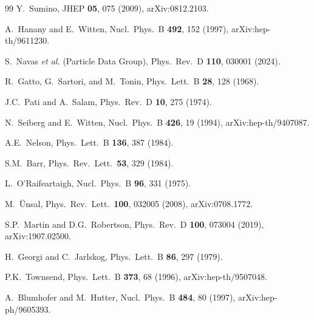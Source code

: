 \documentclass[12pt,a4paper]{article}
\begin{document}
\begin{thebibliography}{99}
  Y.~Sumino,
  JHEP \textbf{05}, 075 (2009),
  arXiv:0812.2103.

  A.~Hanany and E.~Witten,
  Nucl.\ Phys.\ B \textbf{492}, 152 (1997),
  arXiv:hep-th/9611230.

  S.~Navas \textit{et al.} (Particle Data Group),
  Phys.\ Rev.\ D \textbf{110}, 030001 (2024).

  R.~Gatto, G.~Sartori, and M.~Tonin,
  Phys.\ Lett.\ B \textbf{28}, 128 (1968).

  J.C.~Pati and A.~Salam,
  Phys.\ Rev.\ D \textbf{10}, 275 (1974).

  N.~Seiberg and E.~Witten,
  Nucl.\ Phys.\ B \textbf{426}, 19 (1994),
  arXiv:hep-th/9407087.

  A.E.~Nelson,
  Phys.\ Lett.\ B \textbf{136}, 387 (1984).

  S.M.~Barr,
  Phys.\ Rev.\ Lett.\ \textbf{53}, 329 (1984).

  L.~O'Raifeartaigh,
  Nucl.\ Phys.\ B \textbf{96}, 331 (1975).

  M.~\"Unsal,
  Phys.\ Rev.\ Lett.\ \textbf{100}, 032005 (2008),
  arXiv:0708.1772.

  S.P.~Martin and D.G.~Robertson,
  Phys.\ Rev.\ D \textbf{100}, 073004 (2019),
  arXiv:1907.02500.

  H.~Georgi and C.~Jarlskog,
  Phys.\ Lett.\ B \textbf{86}, 297 (1979).

  P.K.~Townsend,
  Phys.\ Lett.\ B \textbf{373}, 68 (1996),
  arXiv:hep-th/9507048.

  A.~Blumhofer and M.~Hutter,
  Nucl.\ Phys.\ B \textbf{484}, 80 (1997),
  arXiv:hep-ph/9605393.

\end{thebibliography}
\end{document}
